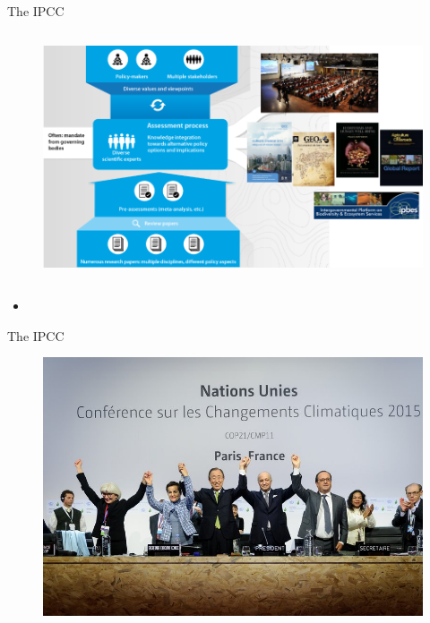 \documentclass[9pt]{beamer}
\begin{document}
\begin{frame}{The IPCC}

\begin{columns}
	\begin{column}{1\linewidth}
		\begin{figure}
			\includegraphics[width=0.9\linewidth]{images/assessments_pyramid.png}
		\end{figure}
	\end{column}
\end{columns}
\begin{itemize}
	\item 
\end{itemize}

\end{frame}

\begin{frame}{The IPCC}

\begin{figure}
	\includegraphics[width=\linewidth]{images/paris.jpg}
\end{figure}

\end{frame}
\end{document}
